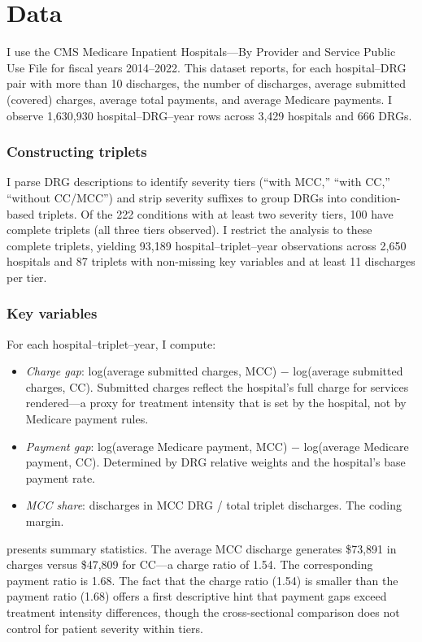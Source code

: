 \documentclass[12pt]{article}
\begin{document}
\section{Data}
\label{sec:data}

I use the CMS Medicare Inpatient Hospitals---By Provider and Service Public Use File for fiscal years 2014--2022. This dataset reports, for each hospital--DRG pair with more than 10 discharges, the number of discharges, average submitted (covered) charges, average total payments, and average Medicare payments. I observe 1,630,930 hospital--DRG--year rows across 3,429 hospitals and 666 DRGs.

\subsubsection*{Constructing triplets} I parse DRG descriptions to identify severity tiers (``with MCC,'' ``with CC,'' ``without CC/MCC'') and strip severity suffixes to group DRGs into condition-based triplets. Of the 222 conditions with at least two severity tiers, 100 have complete triplets (all three tiers observed). I restrict the analysis to these complete triplets, yielding 93,189 hospital--triplet--year observations across 2,650 hospitals and 87 triplets with non-missing key variables and at least 11 discharges per tier.

\subsubsection*{Key variables} For each hospital--triplet--year, I compute:
\begin{itemize}
  \item \textit{Charge gap}: log(average submitted charges, MCC) $-$ log(average submitted charges, CC). Submitted charges reflect the hospital's full charge for services rendered---a proxy for treatment intensity that is set by the hospital, not by Medicare payment rules.
  \item \textit{Payment gap}: log(average Medicare payment, MCC) $-$ log(average Medicare payment, CC). Determined by DRG relative weights and the hospital's base payment rate.
  \item \textit{MCC share}: discharges in MCC DRG / total triplet discharges. The coding margin.
\end{itemize}



 presents summary statistics. The average MCC discharge generates \$73,891 in charges versus \$47,809 for CC---a charge ratio of 1.54. The corresponding payment ratio is 1.68. The fact that the charge ratio (1.54) is smaller than the payment ratio (1.68) offers a first descriptive hint that payment gaps exceed treatment intensity differences, though the cross-sectional comparison does not control for patient severity within tiers.
\end{document}
